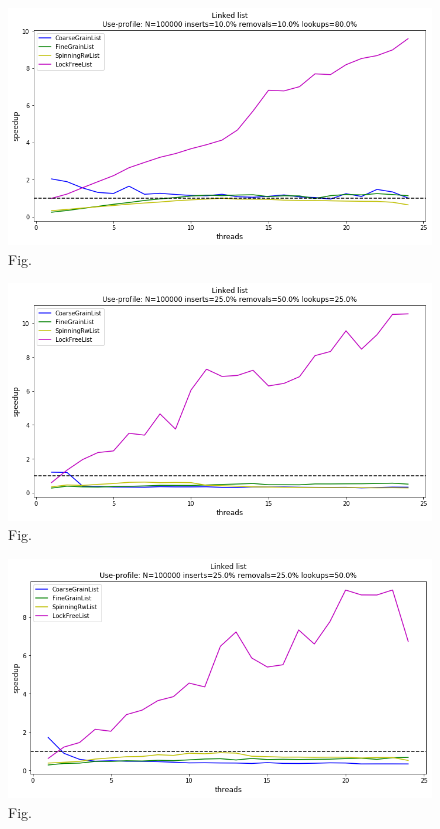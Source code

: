 \documentclass[11pt]{article}
\begin{document}
\begin{figure}[h]
\centering
\includegraphics[width=1.0\linewidth]{figs/lateday/combined/lateday_combined_list_insert_10_lookup_80_removal_10}
\caption{Fig.}
\label{fig:fig1}
\end{figure}

\begin{figure}[h]
\centering
\includegraphics[width=1.0\linewidth]{figs/lateday/combined/lateday_combined_list_insert_25_lookup_25_removal_50}
\caption{Fig.}
\label{fig:fig1}
\end{figure}

\begin{figure}[h]
\centering
\includegraphics[width=1.0\linewidth]{figs/lateday/combined/lateday_combined_list_insert_25_lookup_50_removal_25}
\caption{Fig.}
\label{fig:fig1}
\end{figure}
\end{document}
